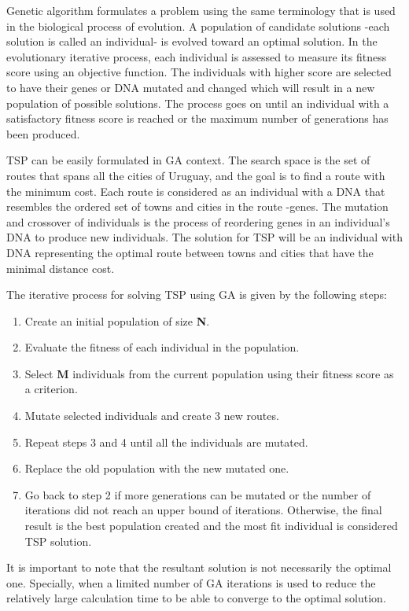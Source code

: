 \documentclass[twocolumn]{article}
\begin{document}
	Genetic algorithm formulates a problem using the same terminology that is used in the biological process of evolution. A population of candidate solutions -each solution is called an individual- is evolved toward an optimal solution. In the evolutionary iterative process, each individual is assessed to measure its fitness score using an objective function. The individuals with higher score are selected to have their genes or DNA mutated and changed which will result in a new population of possible solutions. The process goes on until an individual with a satisfactory fitness score is reached or the maximum number of generations has been produced.
	
	TSP can be easily formulated in GA context. The search space is the set of routes that spans all the cities of Uruguay, and the goal is to find a route with the minimum cost. Each route is considered as an individual with a DNA that resembles the ordered set of towns and cities in the route -genes. The mutation and crossover of individuals is the process of reordering genes in an individual's DNA to produce new individuals. The solution for TSP will be an individual with DNA representing the optimal route between towns and cities that have the minimal distance cost.
	
	The iterative process for solving TSP using GA is given by the following steps:
	\begin{enumerate}
		\item Create an initial population of size {\bfseries N}.
		\item Evaluate the fitness of each individual in the population.
		\item Select {\bfseries M} individuals from the current population using their fitness score as a criterion.
		\item Mutate selected individuals and create 3 new routes.
		\item Repeat steps 3 and 4 until all the individuals are mutated.
		\item Replace the old population with the new mutated one.
		\item Go back to step 2 if more generations can be mutated or the number of iterations did not reach an upper bound of iterations. Otherwise, the final result is the best population created and the most fit individual is considered TSP solution.  
	\end{enumerate}
	It is important to note that the resultant solution is not necessarily the optimal one. Specially, when a limited number of GA iterations is used to reduce the relatively large calculation time to be able to converge to the optimal solution.
	
\end{document}
